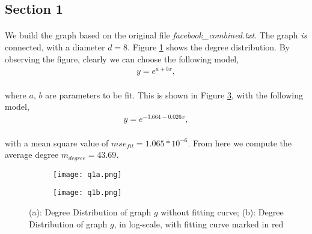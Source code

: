 \subsection*{Section 1}
\paragraph{}
We build the graph based on the original file \textit{facebook\_combined.txt}. The graph \textit{is} connected, with a diameter $d =8$. Figure \ref{fig:a} shows the degree distribution. By observing the figure, clearly we can choose the following model,
\begin{align*}
y = e^{a + bx},
\end{align*}
\paragraph{}
where $a$, $b$ are parameters to be fit. This is shown in Figure \ref{fig:b}, with the following model,
\begin{align*}
y = e^{-3.664 - 0.026x},
\end{align*}
\paragraph{}
with a mean square value of $mse_{fit} = 1.065*10^{-6}$. From here we compute the average degree $m_{degree}  = 43.69$. 

\begin{figure}[h]
	\centering
	\begin{subfigure}{.5\textwidth}
		\centering
		\texttt{[image: q1a.png]}
		\caption{}		
		\label{fig:a}
	\end{subfigure}%
	\begin{subfigure}{.5\textwidth}
		\centering
		\texttt{[image: q1b.png]}
		\caption{}	
		\label{fig:b}
	\end{subfigure}
	\caption{(a): Degree Distribution of graph $g$ without fitting curve; (b): Degree Distribution of graph $g$, in log-scale, with fitting curve marked in red }
\end{figure}